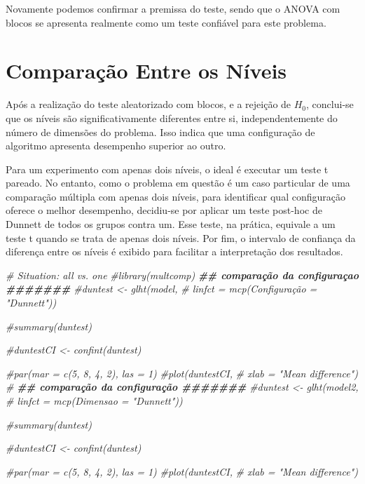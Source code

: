 \documentclass[
]{article}
\newenvironment{Shaded}{\begin{snugshade}}{\end{snugshade}}
\newcommand{\CommentTok}[1]{\textcolor[rgb]{0.56,0.35,0.01}{\textit{#1}}}
\newcommand{\DocumentationTok}[1]{\textcolor[rgb]{0.56,0.35,0.01}{\textbf{\textit{#1}}}}
\begin{document}
Novamente podemos confirmar a premissa do teste, sendo que o ANOVA com
blocos se apresenta realmente como um teste confiável para este
problema.

\hypertarget{comparauxe7uxe3o-entre-os-nuxedveis}{%
\section{Comparação Entre os
Níveis}\label{comparauxe7uxe3o-entre-os-nuxedveis}}

Após a realização do teste aleatorizado com blocos, e a rejeição de
\(H_0\), conclui-se que os níveis são significativamente diferentes
entre si, independentemente do número de dimensões do problema. Isso
indica que uma configuração de algoritmo apresenta desempenho superior
ao outro.

Para um experimento com apenas dois níveis, o ideal é executar um teste
t pareado. No entanto, como o problema em questão é um caso particular
de uma comparação múltipla com apenas dois níveis, para identificar qual
configuração oferece o melhor desempenho, decidiu-se por aplicar um
teste post-hoc de Dunnett de todos os grupos contra um. Esse teste, na
prática, equivale a um teste t quando se trata de apenas dois níveis.
Por fim, o intervalo de confiança da diferença entre os níveis é exibido
para facilitar a interpretação dos resultados.

\begin{Shaded}
\begin{Highlighting}[]
\CommentTok{\# Situation: all vs. one}
\CommentTok{\#library(multcomp)}
\DocumentationTok{\#\# comparação da configuraçao \#\#\#\#\#\#\#}
\CommentTok{\#duntest     \textless{}{-} glht(model,}
                  \CommentTok{\#  linfct = mcp(Configuração = "Dunnett"))}

\CommentTok{\#summary(duntest)}

\CommentTok{\#duntestCI   \textless{}{-} confint(duntest)}

\CommentTok{\#par(mar = c(5, 8, 4, 2), las = 1)}
\CommentTok{\#plot(duntestCI,}
    \CommentTok{\# xlab = "Mean difference")}
\CommentTok{\#}
\DocumentationTok{\#\# comparação da configuração \#\#\#\#\#\#\#}
\CommentTok{\#duntest     \textless{}{-} glht(model2,}
           \CommentTok{\#         linfct = mcp(Dimensao = "Dunnett"))}

\CommentTok{\#summary(duntest)}

\CommentTok{\#duntestCI   \textless{}{-} confint(duntest)}

\CommentTok{\#par(mar = c(5, 8, 4, 2), las = 1)}
\CommentTok{\#plot(duntestCI,}
    \CommentTok{\# xlab = "Mean difference")}
\end{Highlighting}
\end{Shaded}
\end{document}
